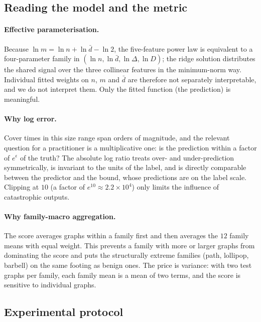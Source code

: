 \documentclass{article}
\begin{document}
\subsection{Reading the model and the metric}
\label{sec:reading}
\paragraph{Effective parameterisation.} Because $\ln m=\ln n+\ln\bar d-\ln 2$, the five-feature power law is equivalent to a four-parameter family in $(\ln n,\ln \bar d,\ln\Delta,\ln D)$; the ridge solution distributes the shared signal over the three collinear features in the minimum-norm way. Individual fitted weights on $n$, $m$ and $\bar d$ are therefore not separately interpretable, and we do not interpret them. Only the fitted function (the prediction) is meaningful.

\paragraph{Why log error.} Cover times in this size range span orders of magnitude, and the relevant question for a practitioner is a multiplicative one: is the prediction within a factor of $e^{\epsilon}$ of the truth? The absolute log ratio treats over- and under-prediction symmetrically, is invariant to the units of the label, and is directly comparable between the predictor and the bound, whose predictions are on the label scale. Clipping at $10$ (a factor of $e^{10}\approx2.2\times10^{4}$) only limits the influence of catastrophic outputs.

\paragraph{Why family-macro aggregation.} The score averages graphs within a family first and then averages the $12$ family means with equal weight. This prevents a family with more or larger graphs from dominating the score and puts the structurally extreme families (path, lollipop, barbell) on the same footing as benign ones. The price is variance: with two test graphs per family, each family mean is a mean of two terms, and the score is sensitive to individual graphs.

\subsection{Experimental protocol}
\label{sec:protocol}
\end{document}
